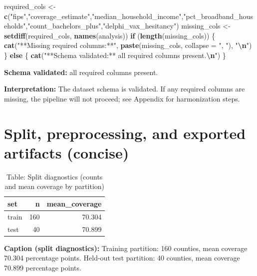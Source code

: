 \documentclass[
  11pt,
]{article}
\newenvironment{Shaded}{\begin{snugshade}}{\end{snugshade}}
\newcommand{\AttributeTok}[1]{\textcolor[rgb]{0.13,0.29,0.53}{#1}}
\newcommand{\ControlFlowTok}[1]{\textcolor[rgb]{0.13,0.29,0.53}{\textbf{#1}}}
\newcommand{\FunctionTok}[1]{\textcolor[rgb]{0.13,0.29,0.53}{\textbf{#1}}}
\newcommand{\NormalTok}[1]{#1}
\newcommand{\OtherTok}[1]{\textcolor[rgb]{0.56,0.35,0.01}{#1}}
\newcommand{\SpecialCharTok}[1]{\textcolor[rgb]{0.81,0.36,0.00}{\textbf{#1}}}
\newcommand{\StringTok}[1]{\textcolor[rgb]{0.31,0.60,0.02}{#1}}
\begin{document}
\begin{Shaded}
\begin{Highlighting}[]
\NormalTok{required\_cols }\OtherTok{\textless{}{-}} \FunctionTok{c}\NormalTok{(}\StringTok{"fips"}\NormalTok{,}\StringTok{"coverage\_estimate"}\NormalTok{,}\StringTok{"median\_household\_income"}\NormalTok{,}\StringTok{"pct\_broadband\_households"}\NormalTok{,}\StringTok{"count\_bachelors\_plus"}\NormalTok{,}\StringTok{"delphi\_vax\_hesitancy"}\NormalTok{)}
\NormalTok{missing\_cols }\OtherTok{\textless{}{-}} \FunctionTok{setdiff}\NormalTok{(required\_cols, }\FunctionTok{names}\NormalTok{(analysis))}
\ControlFlowTok{if}\NormalTok{ (}\FunctionTok{length}\NormalTok{(missing\_cols)) \{}
  \FunctionTok{cat}\NormalTok{(}\StringTok{"**Missing required columns:**"}\NormalTok{, }\FunctionTok{paste}\NormalTok{(missing\_cols, }\AttributeTok{collapse =} \StringTok{", "}\NormalTok{), }\StringTok{"}\SpecialCharTok{\textbackslash{}n}\StringTok{"}\NormalTok{)}
\NormalTok{\} }\ControlFlowTok{else}\NormalTok{ \{}
  \FunctionTok{cat}\NormalTok{(}\StringTok{"**Schema validated:** all required columns present.}\SpecialCharTok{\textbackslash{}n}\StringTok{"}\NormalTok{)}
\NormalTok{\}}
\end{Highlighting}
\end{Shaded}

\textbf{Schema validated:} all required columns present.

\textbf{Interpretation:} The dataset schema is validated. If any
required columns are missing, the pipeline will not proceed; see
Appendix for harmonization steps.

\newpage

\section{Split, preprocessing, and exported artifacts
(concise)}\label{split-preprocessing-and-exported-artifacts-concise}

\begin{longtable}[t]{lrr}
\caption{\label{tab:split-and-prep}Table: Split diagnostics (counts and mean coverage by partition)}\\
\toprule
set & n & mean\_coverage\\
\midrule
train & 160 & 70.304\\
test & 40 & 70.899\\
\bottomrule
\end{longtable}

\textbf{Caption (split diagnostics):} Training partition: 160 counties,
mean coverage 70.304 percentage points. Held-out test partition: 40
counties, mean coverage 70.899 percentage points.
\end{document}
